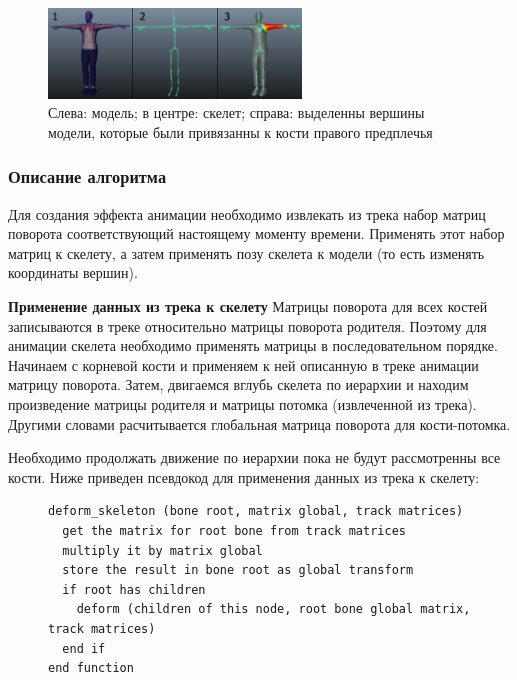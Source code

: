 \begin{figure}[h!]
    \centering
    \includegraphics[width=0.6\textwidth]{skinning.png}
    \caption{\small{Слева: модель; в центре: скелет; справа: выделенны вершины модели, которые были привязанны к кости правого предплечья}}
\end{figure}

\subsubsection{Описание алгоритма}




Для создания эффекта анимации необходимо извлекать из трека набор матриц поворота соответствующий настоящему моменту времени. Применять этот набор матриц к скелету, а затем применять позу скелета к модели (то есть изменять координаты вершин).

\textbf{Применение данных из трека к скелету}
Матрицы поворота для всех костей записываются в треке относительно матрицы поворота родителя.
Поэтому для анимации скелета необходимо применять матрицы в последовательном порядке.
Начинаем с корневой кости и применяем к ней описанную в треке анимации матрицу поворота.
Затем, двигаемся вглубь скелета по иерархии и находим произведение матрицы родителя и матрицы потомка (извлеченной из трека). Другими словами расчитывается глобальная матрица поворота для кости-потомка.

Необходимо продолжать движение по иерархии пока не будут рассмотренны все кости. Ниже приведен псевдокод для применения данных из трека к скелету:

\begin{figure}[h!]
\begin{small}
\begin{verbatim}
deform_skeleton (bone root, matrix global, track matrices)
  get the matrix for root bone from track matrices
  multiply it by matrix global
  store the result in bone root as global transform
  if root has children
    deform (children of this node, root bone global matrix, track matrices)
  end if
end function
\end{verbatim}
\end{small}
\end{figure}

